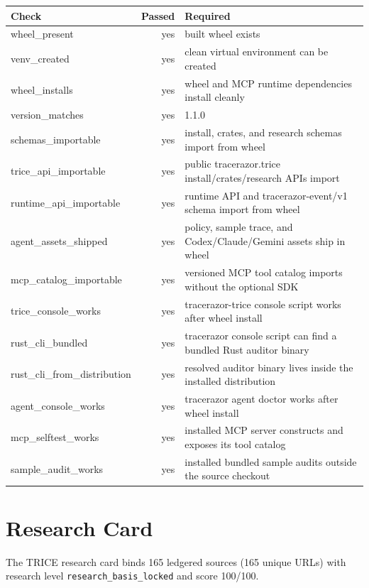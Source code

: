 \documentclass[10pt]{article}
\begin{document}
\begin{tabular}{lrl}
Check & Passed & Required \\
\hline
wheel\_present & yes & built wheel exists \\
venv\_created & yes & clean virtual environment can be created \\
wheel\_installs & yes & wheel and MCP runtime dependencies install cleanly \\
version\_matches & yes & 1.1.0 \\
schemas\_importable & yes & install, crates, and research schemas import from wheel \\
trice\_api\_importable & yes & public tracerazor.trice install/crates/research APIs import \\
runtime\_api\_importable & yes & runtime API and tracerazor-event/v1 schema import from wheel \\
agent\_assets\_shipped & yes & policy, sample trace, and Codex/Claude/Gemini assets ship in wheel \\
mcp\_catalog\_importable & yes & versioned MCP tool catalog imports without the optional SDK \\
trice\_console\_works & yes & tracerazor-trice console script works after wheel install \\
rust\_cli\_bundled & yes & tracerazor console script can find a bundled Rust auditor binary \\
rust\_cli\_from\_distribution & yes & resolved auditor binary lives inside the installed distribution \\
agent\_console\_works & yes & tracerazor agent doctor works after wheel install \\
mcp\_selftest\_works & yes & installed MCP server constructs and exposes its tool catalog \\
sample\_audit\_works & yes & installed bundled sample audits outside the source checkout \\
\end{tabular}


        \section{Research Card}
The TRICE research card binds 165 ledgered sources (165 unique URLs) with research level \texttt{research\_basis\_locked} and score 100/100.
\end{document}
